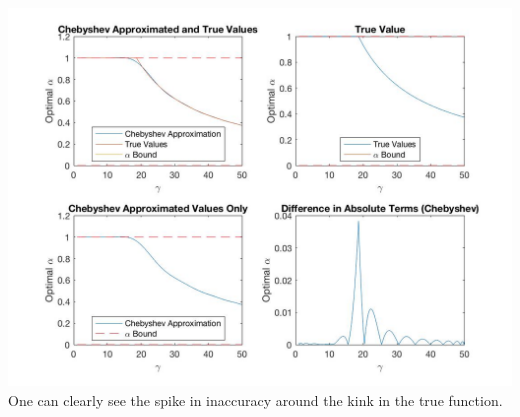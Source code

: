 \documentclass{article}
\begin{document}
\includegraphics[width = \textwidth, keepaspectratio]{PS4Q3CHEB_constrained.jpg}
One can clearly see the spike in inaccuracy around the kink in the true function. 
\end{document}
